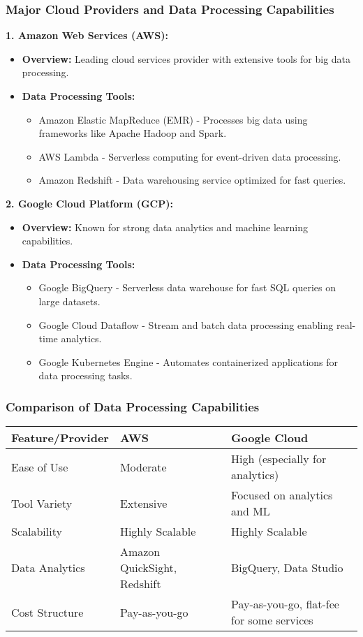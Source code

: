 \documentclass[aspectratio=169]{beamer}
\begin{document}
\begin{frame}[fragile]
  \frametitle{Major Cloud Providers and Data Processing Capabilities}
  
  \textbf{1. Amazon Web Services (AWS):}
  \begin{itemize}
    \item \textbf{Overview:} Leading cloud services provider with extensive tools for big data processing.
    \item \textbf{Data Processing Tools:}
      \begin{itemize}
        \item Amazon Elastic MapReduce (EMR) - Processes big data using frameworks like Apache Hadoop and Spark.
        \item AWS Lambda - Serverless computing for event-driven data processing.
        \item Amazon Redshift - Data warehousing service optimized for fast queries.
      \end{itemize}
  \end{itemize}
  
  \textbf{2. Google Cloud Platform (GCP):}
  \begin{itemize}
    \item \textbf{Overview:} Known for strong data analytics and machine learning capabilities.
    \item \textbf{Data Processing Tools:}
      \begin{itemize}
        \item Google BigQuery - Serverless data warehouse for fast SQL queries on large datasets.
        \item Google Cloud Dataflow - Stream and batch data processing enabling real-time analytics.
        \item Google Kubernetes Engine - Automates containerized applications for data processing tasks.
      \end{itemize}
  \end{itemize}
\end{frame}

\begin{frame}[fragile]
  \frametitle{Comparison of Data Processing Capabilities}
  \begin{center}
    \begin{tabular}{|l|l|l|}
      \hline
      \textbf{Feature/Provider} & \textbf{AWS} & \textbf{Google Cloud} \\
      \hline
      Ease of Use & Moderate & High (especially for analytics) \\
      \hline
      Tool Variety & Extensive & Focused on analytics and ML \\
      \hline
      Scalability & Highly Scalable & Highly Scalable \\
      \hline
      Data Analytics & Amazon QuickSight, Redshift & BigQuery, Data Studio \\
      \hline
      Cost Structure & Pay-as-you-go & Pay-as-you-go, flat-fee for some services \\
      \hline
    \end{tabular}
  \end{center}
\end{frame}
\end{document}
